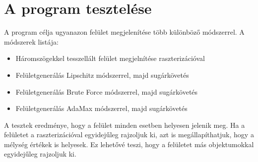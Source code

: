 \section{A program tesztelése}

A program célja ugyanazon felület megjelenítése több különböző módszerrel. A módszerek listája: 
\begin{itemize}
	\item Háromszögekkel tesszellált felület megjelnítése raszterizációval
	\item Felületgenerálás Lipschitz módszerrel, majd sugárkövetés
	\item Felületgenerálás Brute Force módszerrel, majd sugárkövetés
	\item Felületgenerálás AdaMax módszerrel, majd sugárkövetés
\end{itemize}
A tesztek eredménye, hogy a felület minden esetben helyesen jelenik meg. Ha a felületet a raszterizációval egyidejűleg rajzoljuk ki, azt is megállapíthatjuk, hogy a mélység értékek is helyesek. Ez lehetővé teszi, hogy a felületet más objektumokkal egyidejűleg rajzoljuk ki.





